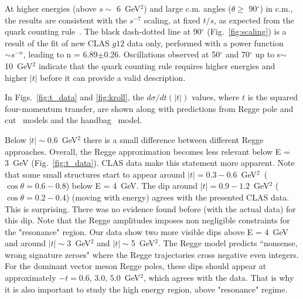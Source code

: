 \documentclass[aps,prc,twocolumn,floatfix,showpacs,preprintnumbers,amsmath,amssymb,superscriptaddress]{revtex4-1}
\begin{document}
At higher energies (above $s\sim$ 6~GeV$^2$) and large c.m. angles 
($\theta\geq$ 90$^\circ$) in c.m., the results are consistent 
with the $s^{-7}$ scaling, at fixed $t/s$, as expected from the quark counting 
rule~\cite{Stan}. The black dash-dotted line at 90$^\circ$ 
(Fig.~\ref{fig:scaling}) is a result of the fit of new CLAS 
$g12$ data only, performed with a power function $\sim s^{-n}$, 
leading to n = 6.89$\pm$0.26.  Oscillations observed at 
50$^\circ$ and 70$^\circ$ up to s$\sim$10~GeV$^2$ indicate
that the quark counting rule requires higher energies and 
higher $|t|$ before it can provide a valid description.

In Figs.~\ref{fig:t_data} and \ref{fig:kroll}, the 
$d\sigma/dt(|t|)$ values, where $t$ is the squared four-momentum 
transfer, are shown along with predictions from Regge 
pole and cut~\cite{Goldstein,Laget,Mathieu,Donnachie} models and the
handbag~\cite{Kroll} model. 

Below $|t|\sim$0.6~GeV$^2$ there is a small difference between different Regge 
approaches.  Overall, the Regge approximation becomes less 
relevant below E = 3~GeV (Fig.~\ref{fig:t_data}).  CLAS data 
make this statement more apparent.  Note that some small 
structures start to appear around $|t| = 
0.3-0.6$~GeV$^2$~($\cos\theta = 0.6-0.8$) below E = 4~GeV.  The dip 
around $|t| = 0.9-1.2$~GeV$^2$ ($\cos\theta = 0.2-0.4$) (moving 
with energy) agrees with the presented CLAS data.  This is surprising.  
There was no evidence found before (with the actual data) for 
this dip. Note that the Regge amplitudes imposes non negligible 
constraints for the "resonance" region.  Our data show two more 
visible dips above E = 4~GeV and around $|t|\sim$3~GeV$^2$ and 
$|t|\sim$5~GeV$^2$. The Regge model predicts ``nonsense, wrong 
signature zeroes" where the Regge trajectories cross negative 
even integers. For the dominant vector meson Regge poles, these 
dips should appear at approximately $-t=0.6, \, 3.0, \, 
5.0$~GeV$^2$,  which agrees with the data.  That is why 
it is also important to study the high energy region, above 
"resonance" regime.
\end{document}
